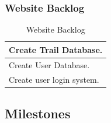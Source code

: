 \documentclass[11pt,a4paper]{article}
\renewcommand{\arraystretch}{1.5}
\begin{document}
\subsubsection{Website Backlog}
\begin{table}[H]
\centering
\begin{tabular}{|l|}
\hline
Create Trail Database. \\ \hline
Create User Database. \\ \hline
Create user login system. \\ \hline
\end{tabular}
\caption{Website Backlog}
\label{tab:webBacklog}
\end{table}

\subsection{Milestones}
\label{sec:plan-milestones}

\renewcommand{\arraystretch}{1.5}
\newcommand*{\tableIndent}{\hspace*{0.4cm}}
\end{document}
